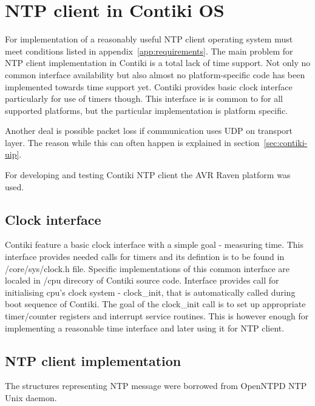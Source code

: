 
\chapter{NTP client in Contiki OS}

For implementation of a reasonably useful NTP client
operating system must meet conditions listed in appendix~\ref{app:requirements}.
The main problem for NTP client implementation in Contiki is a total
lack of time support.
Not only no common interface availability but also
almost no platform-specific code has been implemented towards time support yet.
Contiki provides basic clock interface particularly for use of timers though.
This interface is is common to for all supported platforms, but the particular implementation
is platform specific.

Another deal is possible packet loss if communication uses UDP on transport layer.
The reason while this can often happen is explained in section~\ref{sec:contiki-uip}.

For developing and testing Contiki NTP client the AVR Raven platform was used.

\section{Clock interface}
Contiki feature a basic clock interface with a simple goal - measuring time.
This interface provides needed calls for timers and its defintion is to be found in /core/sys/clock.h file.
Specific implementations of this common interface are localed in /cpu direcory of Contiki source code.
Interface provides call for initialising cpu's clock system - clock\_init, that is automatically called during
boot sequence of Contiki.
The goal of the clock\_init call is to set up
appropriate timer/counter registers and interrupt service routines.
This is however enough for implementing a reasonable time interface and later using it for NTP client.




\section{NTP client implementation}
The structures representing NTP message were borrowed from OpenNTPD NTP Unix daemon.
